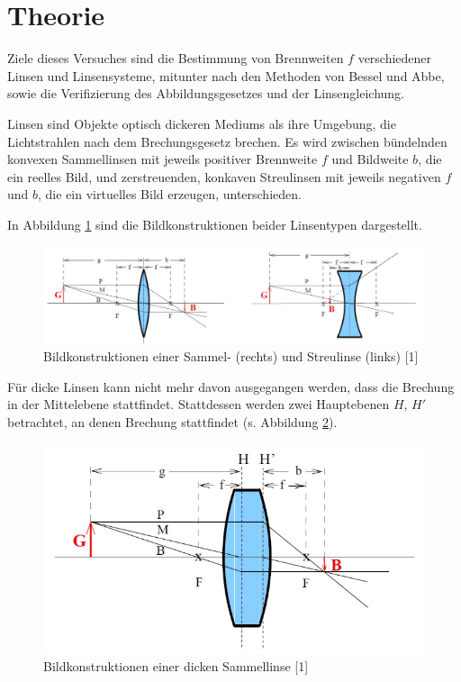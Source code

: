 \section{Theorie}
\label{sec:Theorie}
Ziele dieses Versuches sind die Bestimmung von Brennweiten $f$ verschiedener
Linsen und Linsensysteme, mitunter nach den Methoden von Bessel und Abbe, sowie
die Verifizierung des Abbildungsgesetzes und der Linsengleichung.

Linsen sind Objekte optisch dickeren Mediums als ihre Umgebung, die Lichtstrahlen
nach dem Brechungsgesetz brechen. Es wird zwischen bündelnden konvexen Sammellinsen
mit jeweils positiver Brennweite $f$ und Bildweite $b$, die ein reelles Bild,
und zerstreuenden, konkaven Streulinsen mit jeweils negativen $f$ und $b$, die
ein virtuelles Bild erzeugen, unterschieden.

In Abbildung \ref{fig:bild1} sind die Bildkonstruktionen beider Linsentypen dargestellt.

\begin{figure} [H]
    \centering
    \includegraphics[scale=0.35]{content/bild1.png}
    \caption{Bildkonstruktionen einer Sammel- (rechts) und Streulinse (links) [1]}
    \label{fig:bild1}
  \end{figure}

  Für dicke Linsen kann nicht mehr davon ausgegangen werden, dass die Brechung in der Mittelebene
  stattfindet. Stattdessen werden zwei Hauptebenen $H$, $H'$ betrachtet, an denen Brechung stattfindet
  (s. Abbildung \ref{fig:bild2}).

  \begin{figure} [H]
    \centering
    \includegraphics[scale=0.35]{content/bild2.png}
    \caption{Bildkonstruktionen einer dicken Sammellinse [1]}
    \label{fig:bild2}
  \end{figure}

